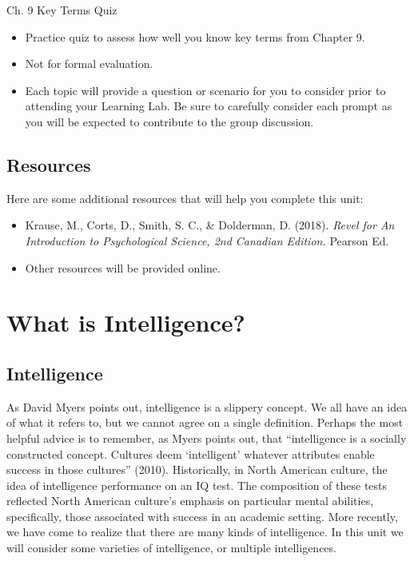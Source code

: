 \documentclass[
]{book}
\providecommand{\tightlist}{%
  \setlength{\itemsep}{0pt}\setlength{\parskip}{0pt}}
\begin{document}
\begin{reflect}
{Ch. 9 Key Terms Quiz}

\begin{itemize}
\tightlist
\item
  Practice quiz to assess how well you know key terms from Chapter 9.\\
\item
  Not for formal evaluation.\\
\item
  Each topic will provide a question or scenario for you to consider prior to attending your Learning Lab. Be sure to carefully consider each prompt as you will be expected to contribute to the group discussion.
\end{itemize}
\end{reflect}

\hypertarget{resources-1}{%
\subsection*{Resources}\label{resources-1}}

Here are some additional resources that will help you complete this unit:

\begin{itemize}
\tightlist
\item
  Krause, M., Corts, D., Smith, S. C., \& Dolderman, D. (2018). \emph{Revel for An Introduction to Psychological Science, 2nd Canadian Edition.} Pearson Ed.\\
\item
  Other resources will be provided online.
\end{itemize}

\hypertarget{what-is-intelligence}{%
\section{What is Intelligence?}\label{what-is-intelligence}}

\hypertarget{intelligence}{%
\subsection*{Intelligence}\label{intelligence}}

As David Myers points out, intelligence is a slippery concept. We all have an idea of what it refers to, but we cannot agree on a single definition. Perhaps the most helpful advice is to remember, as Myers points out, that ``intelligence is a socially constructed concept. Cultures deem `intelligent' whatever attributes enable success in those cultures'' (2010). Historically, in North American culture, the idea of intelligence performance on an IQ test. The composition of these tests reflected North American culture's emphasis on particular mental abilities, specifically, those associated with success in an academic setting. More recently, we have come to realize that there are many kinds of intelligence. In this unit we will consider some varieties of intelligence, or multiple intelligences.
\end{document}

